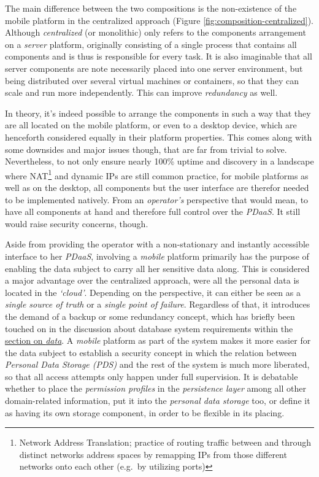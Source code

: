 \documentclass[12pt,english,a4paper,titlepage,cleardoublepage=empty,dottedtoc]{report}
\begin{document}
The main difference between the two compositions is the non-existence of
the mobile platform in the centralized approach (Figure
\ref{fig:composition-centralized}). Although \emph{centralized} (or
monolithic) only refers to the components arrangement on a \emph{server}
platform, originally consisting of a single process that contains all
components and is thus is responsible for every task. It is also
imaginable that all server components are note necessarily placed into
one server environment, but being distributed over several virtual
machines or containers, so that they can scale and run more
independently. This can improve \emph{redundancy} as well.

In theory, it's indeed possible to arrange the components in such a way
that they are all located on the mobile platform, or even to a desktop
device, which are henceforth considered equally in their platform
properties. This comes along with some downsides and major issues
though, that are far from trivial to solve. Nevertheless, to not only
ensure nearly 100\% uptime and discovery in a landscape where
NAT\footnote{Network Address Translation; practice of routing traffic
  between and through distinct networks address spaces by remapping IPs
  from those different networks onto each other (e.g.~by utilizing
  ports)} and dynamic IPs are still common practice, for mobile
platforms as well as on the desktop, all components but the user
interface are therefor needed to be implemented natively. From an
\emph{operator's} perspective that would mean, to have all components at
hand and therefore full control over the \emph{PDaaS}. It still would
raise security concerns, though.

Aside from providing the operator with a non-stationary and instantly
accessible interface to her \emph{PDaaS}, involving a \emph{mobile}
platform primarily has the purpose of enabling the data subject to carry
all her sensitive data along. This is considered a major advantage over
the centralized approach, were all the personal data is located in the
\emph{`cloud'}. Depending on the perspective, it can either be seen as a
\emph{single source of truth} or a \emph{single point of failure}.
Regardless of that, it introduces the demand of a backup or some
redundancy concept, which has briefly been touched on in the discussion
about database system requirements within the
\protect\hyperlink{data}{section on \emph{data}}. A \emph{mobile}
platform as part of the system makes it more easier for the data subject
to establish a security concept in which the relation between
\emph{Personal Data Storage (PDS)} and the rest of the system is much
more liberated, so that all access attempts only happen under full
supervision. It is debatable whether to place the \emph{permission
profiles} in the \emph{persistence layer} among all other domain-related
information, put it into the \emph{personal data storage} too, or define
it as having its own storage component, in order to be flexible in its
placing.
\end{document}
